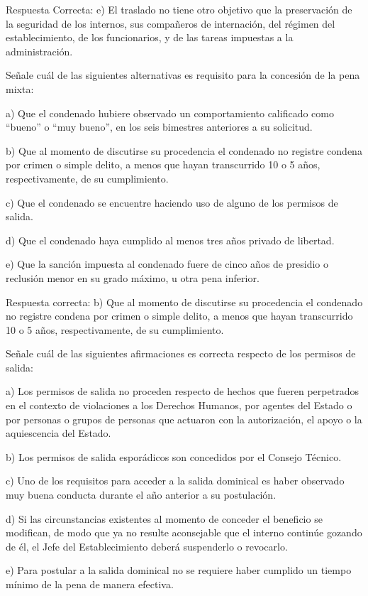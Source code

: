 \documentclass[letterpaper, 11pt]{article}
\begin{document}
Respuesta Correcta:
e) El traslado no tiene otro objetivo que la preservación de la
seguridad de los internos, sus compañeros de internación, del régimen del
establecimiento, de los funcionarios, y de las tareas impuestas a la administración.

Señale cuál de las siguientes alternativas es requisito para la concesión de la pena
mixta:

a) Que el condenado hubiere observado un comportamiento calificado como “bueno” o “muy
bueno”, en los seis bimestres anteriores a su solicitud.

b) Que al momento de discutirse su procedencia el condenado no registre condena por
crimen o simple delito, a menos que hayan transcurrido 10 o 5 años, respectivamente, de
su cumplimiento.

c) Que el condenado se encuentre haciendo uso de alguno de los permisos de salida.

d) Que el condenado haya cumplido al menos tres años privado de libertad.

e) Que la sanción impuesta al condenado fuere de cinco años de presidio o reclusión menor
en su grado máximo, u otra pena inferior.

Respuesta correcta:
b) Que al momento de discutirse su procedencia el condenado
no registre condena por crimen o simple delito, a menos que hayan transcurrido 10
o 5 años, respectivamente, de su cumplimiento.

Señale cuál de las siguientes afirmaciones es correcta respecto de los permisos de
salida:

a) Los permisos de salida no proceden respecto de hechos que fueren perpetrados en el
contexto de violaciones a los Derechos Humanos, por agentes del Estado o por personas
o grupos de personas que actuaron con la autorización, el apoyo o la aquiescencia del
Estado.

b) Los permisos de salida esporádicos son concedidos por el Consejo Técnico.

c) Uno de los requisitos para acceder a la salida dominical es haber observado muy buena
conducta durante el año anterior a su postulación.

d) Si las circunstancias existentes al momento de conceder el beneficio se modifican, de
modo que ya no resulte aconsejable que el interno continúe gozando de él, el Jefe del
Establecimiento deberá suspenderlo o revocarlo.

e) Para postular a la salida dominical no se requiere haber cumplido un tiempo mínimo de
la pena de manera efectiva.
\end{document}
